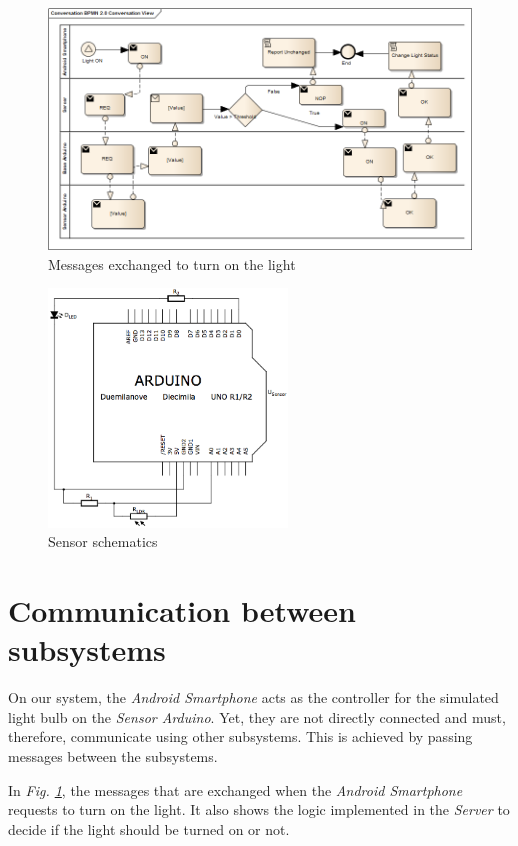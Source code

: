 \documentclass[conference, a4paper]{IEEEtran}
\begin{document}
\begin{figure}
\centering
\includegraphics[width=6in]{ON_Flow}
\caption{Messages exchanged to turn on the light}
\label{fig_on_f}
\end{figure}

\begin{figure}[H]
\centering
\includegraphics[width=2.5in]{Schematics}
\caption{Sensor schematics}
\label{fig_schem}
\end{figure}

\section{Communication between subsystems}

On our system, the \textit{Android Smartphone} acts as the controller for the simulated light bulb on the \textit{Sensor Arduino}. Yet, they are not directly connected and must, therefore, communicate using other subsystems. This is achieved by passing messages between the subsystems.

In \textit{Fig. \ref{fig_on_f}}, the messages that are exchanged when the \textit{Android Smartphone} requests to turn on the light. It also shows the logic implemented in the \textit{Server} to decide if the light should be turned on or not.
\end{document}
